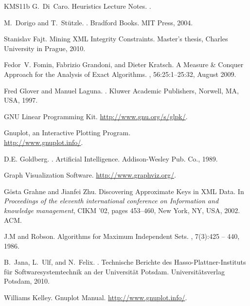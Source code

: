\begin{thebibliography}{KMS{\etalchar{+}}11b}
G.~Di~Caro.
\newblock Heuristics Lecture Notes.
.

M.~Dorigo and T.~St{\"u}tzle.
.
\newblock Bradford Books. MIT Press, 2004.

Stanislav Fajt.
\newblock Mining XML Integrity Constraints.
\newblock Master's thesis, Charles University in Prague, 2010.

Fedor~V. Fomin, Fabrizio Grandoni, and Dieter Kratsch.
\newblock A Measure \& Conquer Approach for the Analysis of Exact Algorithms.
, 56:25:1--25:32, August 2009.

Fred Glover and Manuel Laguna.
.
\newblock Kluwer Academic Publishers, Norwell, MA, USA, 1997.

GNU Linear Programming Kit.
\newblock \url{http://www.gnu.org/s/glpk/}.

Gnuplot, an Interactive Plotting Program.\\
\newblock \url{http://www.gnuplot.info/}.

D.E. Goldberg.
.
\newblock Artificial Intelligence. Addison-Wesley Pub. Co., 1989.

Graph Visualization Software.
\newblock \url{http://www.graphviz.org/}.

G\"{o}sta Grahne and Jianfei Zhu.
\newblock Discovering Approximate Keys in XML Data.
\newblock In {\em Proceedings of the eleventh international conference on Information and knowledge management}, CIKM '02, pages 453--460, New York, NY, USA, 2002. ACM.

J.M and Robson.
\newblock Algorithms for Maximum Independent Sets.
, 7(3):425 -- 440, 1986.

B.~Jana, L.~Ulf, and N.~Felix.
.
\newblock Technische Berichte des Hasso-Plattner-Instituts f{\"u}r Softwaresystemtechnik an der Universit{\"a}t Potsdam. Universit{\"a}tsverlag Potsdam, 2010.

Williams Kelley.
\newblock Gnuplot Manual.
\newblock \url{http://www.gnuplot.info/}.


\end{thebibliography}
